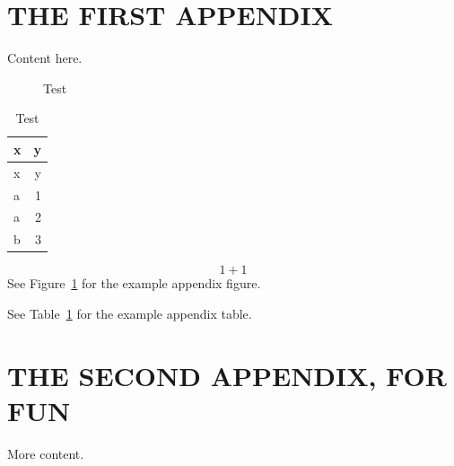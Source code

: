 \documentclass[12pt]{article}\usepackage[]{graphicx}\usepackage[]{color}
\begin{document}
\begin{appendices}

\clearpage

\section{THE FIRST APPENDIX}
\label{app:first-appendix}

Content here.
\begin{figure}[htb]

{\centering {} 

}

\caption{Test}\label{fig:test1}
\end{figure}
\begin{longtable}[]{@{}lr@{}}
\caption{\label{tab:test2}Test}\tabularnewline
\toprule
x & y\tabularnewline
\midrule
\endfirsthead
\toprule
x & y\tabularnewline
\midrule
\endhead
a & 1\tabularnewline
a & 2\tabularnewline
b & 3\tabularnewline
\bottomrule
\end{longtable}
\begin{equation}
  1 + 1
  \label{eq:test2}
\end{equation}
See Figure~\ref{fig:test1} for the example appendix figure.

See Table~\ref{tab:test2} for the example appendix table.

\clearpage

\section{THE SECOND APPENDIX, FOR FUN}
\label{app:second-appendix}

More content.

\end{appendices}
\end{document}

